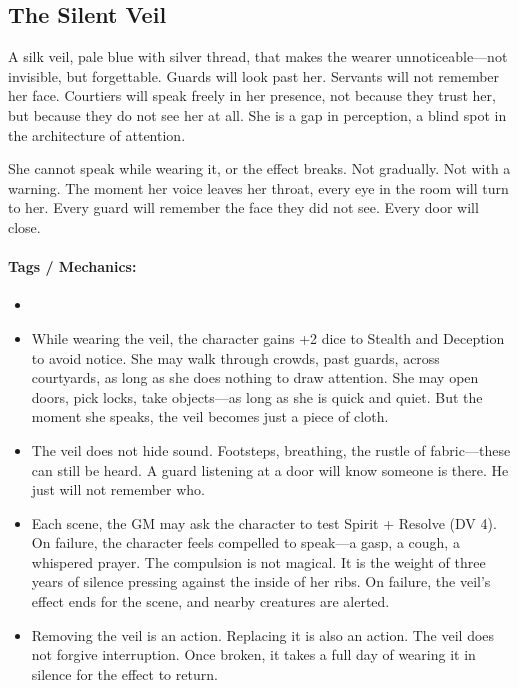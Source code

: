 \subsection*{The Silent Veil}

A silk veil, pale blue with silver thread, that makes the wearer unnoticeable—not invisible, but forgettable. Guards will look past her. Servants will not remember her face. Courtiers will speak freely in her presence, not because they trust her, but because they do not see her at all. She is a gap in perception, a blind spot in the architecture of attention.

She cannot speak while wearing it, or the effect breaks. Not gradually. Not with a warning. The moment her voice leaves her throat, every eye in the room will turn to her. Every guard will remember the face they did not see. Every door will close.

\paragraph{Tags / Mechanics:}
\begin{itemize}
\item [STEALTH] [CURSE] [SILENCE]
\item While wearing the veil, the character gains +2 dice to Stealth and Deception to avoid notice. She may walk through crowds, past guards, across courtyards, as long as she does nothing to draw attention. She may open doors, pick locks, take objects—as long as she is quick and quiet. But the moment she speaks, the veil becomes just a piece of cloth.
\item The veil does not hide sound. Footsteps, breathing, the rustle of fabric—these can still be heard. A guard listening at a door will know someone is there. He just will not remember who.
\item Each scene, the GM may ask the character to test Spirit + Resolve (DV 4). On failure, the character feels compelled to speak—a gasp, a cough, a whispered prayer. The compulsion is not magical. It is the weight of three years of silence pressing against the inside of her ribs. On failure, the veil's effect ends for the scene, and nearby creatures are alerted.
\item Removing the veil is an action. Replacing it is also an action. The veil does not forgive interruption. Once broken, it takes a full day of wearing it in silence for the effect to return.
\end{itemize}


